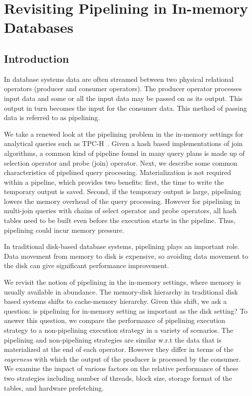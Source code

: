 \chapter{Revisiting Pipelining in In-memory Databases}\label{chap:pipeline}

\section{Introduction}
In database systems data are often streamed between two physical relational operators (producer and consumer operators).
The producer operator processes input data and some or all the input data may be passed on as its output. 
This output in turn becomes the input for the consumer data. 
This method of passing data is referred to as pipelining.

We take a renewed look at the pipelining problem in the in-memory settings for analytical queries such as TPC-H~\cite{tpc-h}.
Given a hash based implementations of join algorithms, a common kind of pipeline found in many query plans is made up of selection operator and probe (join) operator.
Next, we describe some common characteristics of pipelined query processing. 
Materialization is not required within a pipeline, which provides two benefits: first, the time to write the temporary output is saved.
Second, if the temporary output is large, pipelining lowers the memory overhead of the query processing.
However for pipelining in multi-join queries with chains of select operator and probe operators, all hash tables need to be built even before the execution starts in the pipeline.
Thus, pipelining could incur memory pressure.

In traditional disk-based database systems, pipelining plays an important role.
Data movement from memory to disk is expensive, so avoiding data movement to the disk can give significant performance improvement.

We revisit the notion of pipelining in the in-memory settings, where memory is usually available in abundance. 
The memory-disk hierarchy in traditional disk based systems shifts to cache-memory hierarchy.
Given this shift, we ask a question: is pipelining for in-memory setting as important as the disk setting?
To answer this question, we compare the performance of pipelining execution strategy to a non-pipelining execution strategy in a variety of scenarios.
The pipelining and non-pipelining strategies are similar w.r.t the data that is materialized at the end of each operator. 
However they differ in terms of the \textit{eagerness} with which the output of the producer is processed by the consumer.
We examine the impact of various factors on the relative performance of these two strategies including number of threads, block size, storage format of the tables, and hardware prefetching.

